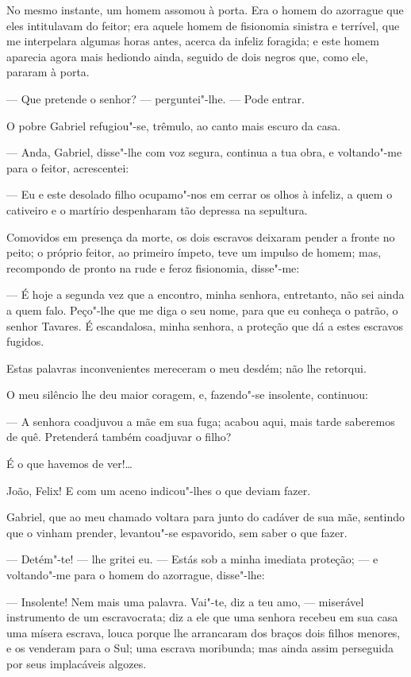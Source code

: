 No mesmo instante, um homem assomou à porta. Era o homem do azorrague
que eles intitulavam do feitor; era aquele homem de fisionomia sinistra
e terrível, que me interpelara algumas horas antes, acerca da infeliz
foragida; e este homem aparecia agora mais hediondo ainda, seguido de
dois negros que, como ele, pararam à porta.

--- Que pretende o senhor? --- perguntei"-lhe. --- Pode entrar.

O pobre Gabriel refugiou"-se, trêmulo, ao canto mais escuro da casa.

--- Anda, Gabriel, disse"-lhe com voz segura, continua a tua obra, e
voltando"-me para o feitor, acrescentei:

--- Eu e este desolado filho ocupamo"-nos em cerrar os olhos à infeliz, a
quem o cativeiro e o martírio despenharam tão depressa na sepultura.

Comovidos em presença da morte, os dois escravos deixaram pender a
fronte no peito; o próprio feitor, ao primeiro ímpeto, teve um impulso
de homem; mas, recompondo de pronto na rude e feroz fisionomia,
disse"-me:

--- É hoje a segunda vez que a encontro, minha senhora, entretanto, não
sei ainda a quem falo. Peço"-lhe que me diga o seu nome, para que eu
conheça o patrão, o senhor Tavares. É escandalosa, minha senhora, a
proteção que dá a estes escravos fugidos.

Estas palavras inconvenientes mereceram o meu desdém; não lhe retorqui.

O meu silêncio lhe deu maior coragem, e, fazendo"-se insolente,
continuou:

--- A senhora coadjuvou a mãe em sua fuga; acabou aqui, mais tarde
saberemos de quê. Pretenderá também coadjuvar o filho?

É o que havemos de ver!\ldots{}

João, Felix! E com um aceno indicou"-lhes o que deviam fazer.

Gabriel, que ao meu chamado voltara para junto do cadáver de sua mãe,
sentindo que o vinham prender, levantou"-se espavorido, sem saber o que
fazer.

--- Detém"-te! --- lhe gritei eu. --- Estás sob a minha imediata proteção;
--- e voltando"-me para o homem do azorrague, disse"-lhe:

--- Insolente! Nem mais uma palavra. Vai"-te, diz a teu amo, --- miserável
instrumento de um escravocrata; diz a ele que uma senhora recebeu em sua
casa uma mísera escrava, louca porque lhe arrancaram dos braços dois
filhos menores, e os venderam para o Sul; uma escrava moribunda; mas
ainda assim perseguida por seus implacáveis algozes.

